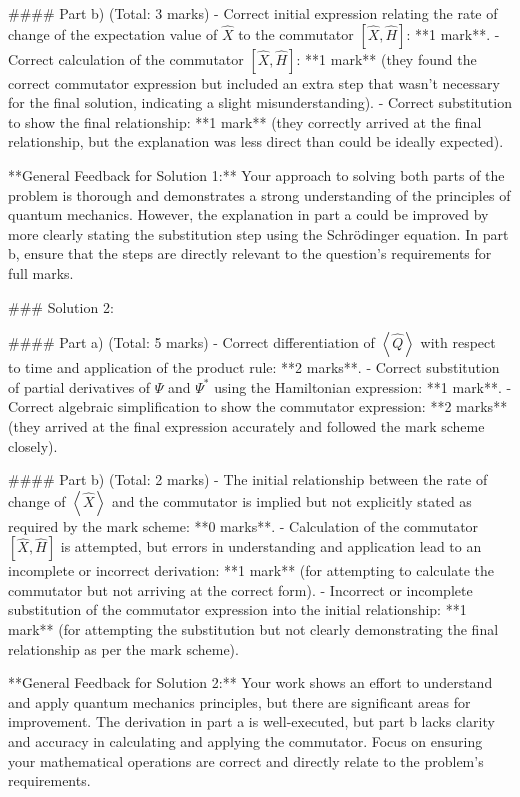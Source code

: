 \documentclass[a4paper,11pt]{article}
\begin{document}
#### Part b) (Total: 3 marks)
- Correct initial expression relating the rate of change of the expectation value of \( \hat{X} \) to the commutator \([ \hat{X}, \hat{H} ]\): **1 mark**.
- Correct calculation of the commutator \([ \hat{X}, \hat{H} ]\): **1 mark** (they found the correct commutator expression but included an extra step that wasn't necessary for the final solution, indicating a slight misunderstanding).
- Correct substitution to show the final relationship: **1 mark** (they correctly arrived at the final relationship, but the explanation was less direct than could be ideally expected).

**General Feedback for Solution 1:** Your approach to solving both parts of the problem is thorough and demonstrates a strong understanding of the principles of quantum mechanics. However, the explanation in part a could be improved by more clearly stating the substitution step using the Schrödinger equation. In part b, ensure that the steps are directly relevant to the question's requirements for full marks.

### Solution 2:

#### Part a) (Total: 5 marks)
- Correct differentiation of \( \left<\hat{Q}\right> \) with respect to time and application of the product rule: **2 marks**.
- Correct substitution of partial derivatives of \(\Psi\) and \(\Psi^{*}\) using the Hamiltonian expression: **1 mark**.
- Correct algebraic simplification to show the commutator expression: **2 marks** (they arrived at the final expression accurately and followed the mark scheme closely).

#### Part b) (Total: 2 marks)
- The initial relationship between the rate of change of \( \left<\hat{X}\right> \) and the commutator is implied but not explicitly stated as required by the mark scheme: **0 marks**.
- Calculation of the commutator \([ \hat{X}, \hat{H} ]\) is attempted, but errors in understanding and application lead to an incomplete or incorrect derivation: **1 mark** (for attempting to calculate the commutator but not arriving at the correct form).
- Incorrect or incomplete substitution of the commutator expression into the initial relationship: **1 mark** (for attempting the substitution but not clearly demonstrating the final relationship as per the mark scheme).

**General Feedback for Solution 2:** Your work shows an effort to understand and apply quantum mechanics principles, but there are significant areas for improvement. The derivation in part a is well-executed, but part b lacks clarity and accuracy in calculating and applying the commutator. Focus on ensuring your mathematical operations are correct and directly relate to the problem's requirements.
\end{document}
